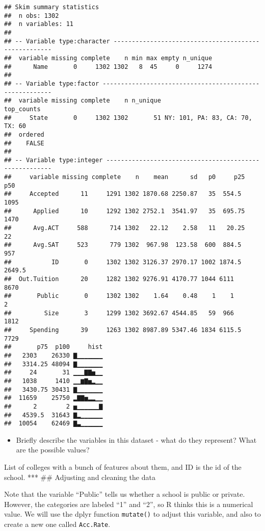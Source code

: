 \documentclass[]{article}
\providecommand{\tightlist}{%
  \setlength{\itemsep}{0pt}\setlength{\parskip}{0pt}}
\begin{document}
\begin{verbatim}
## Skim summary statistics
##  n obs: 1302 
##  n variables: 11 
## 
## -- Variable type:character -----------------------------------------------------
##  variable missing complete    n min max empty n_unique
##      Name       0     1302 1302   8  45     0     1274
## 
## -- Variable type:factor --------------------------------------------------------
##  variable missing complete    n n_unique                      top_counts
##     State       0     1302 1302       51 NY: 101, PA: 83, CA: 70, TX: 60
##  ordered
##    FALSE
## 
## -- Variable type:integer -------------------------------------------------------
##     variable missing complete    n    mean      sd   p0     p25    p50
##     Accepted      11     1291 1302 1870.68 2250.87   35  554.5  1095  
##      Applied      10     1292 1302 2752.1  3541.97   35  695.75 1470  
##      Avg.ACT     588      714 1302   22.12    2.58   11   20.25   22  
##      Avg.SAT     523      779 1302  967.98  123.58  600  884.5   957  
##           ID       0     1302 1302 3126.37 2970.17 1002 1874.5  2649.5
##  Out.Tuition      20     1282 1302 9276.91 4170.77 1044 6111    8670  
##       Public       0     1302 1302    1.64    0.48    1    1       2  
##         Size       3     1299 1302 3692.67 4544.85   59  966    1812  
##     Spending      39     1263 1302 8987.89 5347.46 1834 6115.5  7729  
##       p75  p100     hist
##   2303    26330 ▇▁▁▁▁▁▁▁
##   3314.25 48094 ▇▁▁▁▁▁▁▁
##     24       31 ▁▁▁▇▇▅▁▁
##   1038     1410 ▁▁▆▇▅▂▁▁
##   3430.75 30431 ▇▁▁▁▁▁▁▁
##  11659    25750 ▂▇▇▅▂▂▁▁
##      2        2 ▅▁▁▁▁▁▁▇
##   4539.5  31643 ▇▂▁▁▁▁▁▁
##  10054    62469 ▇▃▁▁▁▁▁▁
\end{verbatim}

\begin{itemize}
\tightlist
\item
  Briefly describe the variables in this dataset - what do they
  represent? What are the possible values?
\end{itemize}

List of colleges with a bunch of features about them, and ID is the id
of the school. *** \#\# Adjusting and cleaning the data

Note that the variable ``Public'' tells us whether a school is public or
private. However, the categories are labeled ``1'' and ``2'', so R
thinks this is a numerical value. We will use the dplyr function
\texttt{mutate()} to adjust this variable, and also to create a new one
called \texttt{Acc.Rate}.
\end{document}
